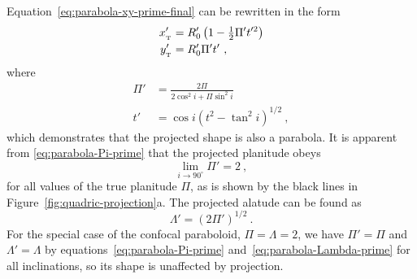 Equation~\eqref{eq:parabola-xy-prime-final} can be rewritten in the
form
\begin{gather}
  \label{eq:parabola-xy-all-primes}
  \begin{aligned}
    x_{_{\mathrm{\scriptscriptstyle T}}}' &= R_0' \left(1  - \tfrac{1}{2} \Pi' t'^2\right) \\
    y_{_{\mathrm{\scriptscriptstyle T}}}' &= R_0' \Pi' t' \ ,
  \end{aligned}
\end{gather}
where
\begin{align}
  \label{eq:parabola-Pi-prime}
  \Pi' &= \frac{2 \Pi} {2 \cos^2 i + \Pi \sin^2 i} \\
  \label{eq:parabola-t-prime}
  t' &= \cos i \left(t^2 - \tan^2 i\right)^{1/2} \ ,
\end{align}
which demonstrates that the projected shape is also a parabola. It is
apparent from \eqref{eq:parabola-Pi-prime} that the projected
planitude obeys
\begin{equation*}
\lim_{i \to 90^\circ} \Pi' = 2 \ ,
\end{equation*}
for all values of the true planitude \(\Pi\), as is shown by the black
lines in Figure~\ref{fig:quadric-projection}a. The projected alatude can
be found as
\begin{equation}
  \label{eq:parabola-Lambda-prime}
  \Lambda' = \left( 2 \Pi' \right)^{1/2} \ .
\end{equation}
For the special case of the confocal paraboloid,
\(\Pi = \Lambda = 2\), we have \(\Pi' = \Pi\) and
\(\Lambda' = \Lambda\) by equations~\eqref{eq:parabola-Pi-prime}
and~\eqref{eq:parabola-Lambda-prime} for all inclinations, so its
shape is unaffected by projection.
